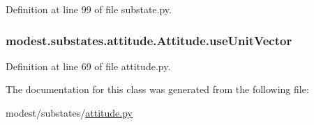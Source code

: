 Definition at line 99 of file substate.\+py.

\subsubsection[{\texorpdfstring{use\+Unit\+Vector}{useUnitVector}}]{\setlength{\rightskip}{0pt plus 5cm}modest.\+substates.\+attitude.\+Attitude.\+use\+Unit\+Vector}\hypertarget{classmodest_1_1substates_1_1attitude_1_1Attitude_a528738f0ad3971fd2476007cc5ef0e1e}{}\label{classmodest_1_1substates_1_1attitude_1_1Attitude_a528738f0ad3971fd2476007cc5ef0e1e}


Definition at line 69 of file attitude.\+py.



The documentation for this class was generated from the following file\+:\begin{DoxyCompactItemize}
\item 
modest/substates/\hyperlink{attitude_8py}{attitude.\+py}\end{DoxyCompactItemize}
